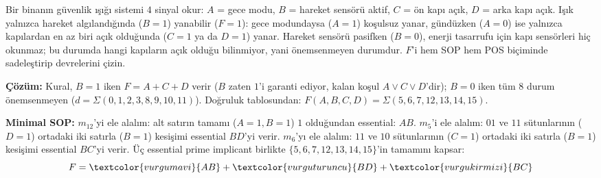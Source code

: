 \begin{alistirma}[\zor]
Bir binanın güvenlik ışığı sistemi $4$ sinyal okur: $A$ = gece modu, $B$ =
hareket sensörü aktif, $C$ = ön kapı açık, $D$ = arka kapı açık. Işık yalnızca
hareket algılandığında ($B=1$) yanabilir ($F=1$): gece modundaysa ($A=1$)
koşulsuz yanar, gündüzken ($A=0$) ise yalnızca kapılardan en az biri açık
olduğunda ($C=1$ ya da $D=1$) yanar. Hareket sensörü pasifken ($B=0$), enerji
tasarrufu için kapı sensörleri hiç okunmaz; bu durumda hangi kapıların açık
olduğu bilinmiyor, yani önemsenmeyen durumdur. $F$'i hem SOP hem POS
biçiminde sadeleştirip devrelerini çizin.

\textbf{Çözüm:} Kural, $B=1$ iken $F=A+C+D$ verir ($B$ zaten $1$'i garanti
ediyor, kalan koşul $A\lor C\lor D$'dir); $B=0$ iken tüm $8$ durum önemsenmeyen
($d=\Sigma(0,1,2,3,8,9,10,11)$). Doğruluk tablosundan:
$F(A,B,C,D)=\Sigma(5,6,7,12,13,14,15)$.

\textbf{Minimal SOP:} $m_{12}$'yi ele alalım: alt satırın tamamı ($A=1,B=1$)
$1$ olduğundan essential: $AB$. $m_5$'i ele alalım: $01$ ve $11$ sütunlarının
($D=1$) ortadaki iki satırla ($B=1$) kesişimi essential $BD$'yi verir. $m_6$'yı
ele alalım: $11$ ve $10$ sütunlarının ($C=1$) ortadaki iki satırla ($B=1$)
kesişimi essential $BC$'yi verir. Üç essential prime implicant birlikte
$\{5,6,7,12,13,14,15\}$'in tamamını kapsar:
\[
F = \textcolor{vurgumavi}{AB} + \textcolor{vurguturuncu}{BD} + \textcolor{vurgukirmizi}{BC}
\]


\end{alistirma}
